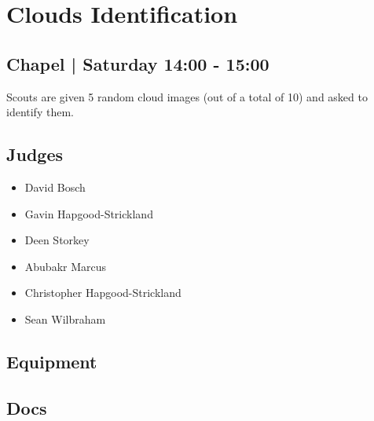 \documentclass[10pt]{article}
\begin{document}
		\begin{minipage}{\linewidth}
		\setcounter{section}{3}
	\section{Clouds Identification }
	\subsection*{Chapel | Saturday 14:00 - 15:00}

	Scouts are given 5 random cloud images (out of a total of 10) and asked to identify them. 

	\begin{multicols}{2}
	\subsection*{\faUsers \: Judges}
	\begin{itemize}
			\item David Bosch
			\item Gavin Hapgood-Strickland
			\item Deen Storkey
			\item Abubakr Marcus
			\item Christopher Hapgood-Strickland
			\item Sean Wilbraham
		\end{itemize}
	\columnbreak
	\subsection*{\faWrench \: Equipment}
	        \vfill\null
        \subsection*{\faFile \: Docs}
     	\end{multicols}


	\vspace{1cm}
	\end{minipage}
\end{document}
